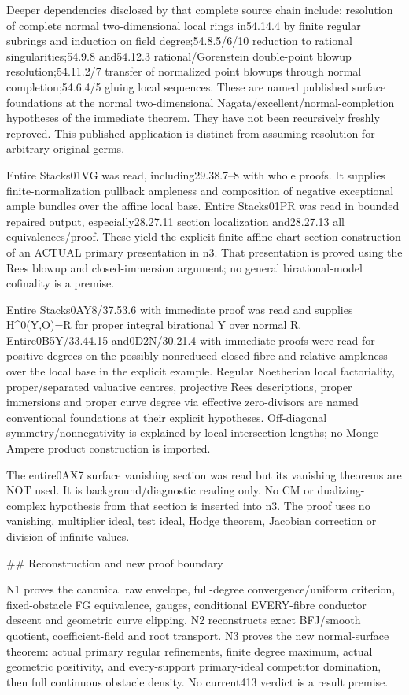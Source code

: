 \documentclass[11pt]{article}
\begin{document}
Deeper dependencies disclosed by that complete source chain include: resolution of complete normal two-dimensional local rings in54.14.4 by finite regular subrings and induction on field degree;54.8.5/6/10 reduction to rational singularities;54.9.8 and54.12.3 rational/Gorenstein double-point blowup resolution;54.11.2/7 transfer of normalized point blowups through normal completion;54.6.4/5 gluing local sequences. These are named published surface foundations at the normal two-dimensional Nagata/excellent/normal-completion hypotheses of the immediate theorem. They have not been recursively freshly reproved. This published application is distinct from assuming resolution for arbitrary original germs.

Entire Stacks01VG was read, including29.38.7--8 with whole proofs. It supplies finite-normalization pullback ampleness and composition of negative exceptional ample bundles over the affine local base. Entire Stacks01PR was read in bounded repaired output, especially28.27.11 section localization and28.27.13 all equivalences/proof. These yield the explicit finite affine-chart section construction of an ACTUAL primary presentation in n3. That presentation is proved using the Rees blowup and closed-immersion argument; no general birational-model cofinality is a premise.

Entire Stacks0AY8/37.53.6 with immediate proof was read and supplies H\textasciicircum{}0(Y,O)=R for proper integral birational Y over normal R. Entire0B5Y/33.44.15 and0D2N/30.21.4 with immediate proofs were read for positive degrees on the possibly nonreduced closed fibre and relative ampleness over the local base in the explicit example. Regular Noetherian local factoriality, proper/separated valuative centres, projective Rees descriptions, proper immersions and proper curve degree via effective zero-divisors are named conventional foundations at their explicit hypotheses. Off-diagonal symmetry/nonnegativity is explained by local intersection lengths; no Monge--Ampere product construction is imported.

The entire0AX7 surface vanishing section was read but its vanishing theorems are NOT used. It is background/diagnostic reading only. No CM or dualizing-complex hypothesis from that section is inserted into n3. The proof uses no vanishing, multiplier ideal, test ideal, Hodge theorem, Jacobian correction or division of infinite values.

\#\# Reconstruction and new proof boundary

N1 proves the canonical raw envelope, full-degree convergence/uniform criterion, fixed-obstacle FG equivalence, gauges, conditional EVERY-fibre conductor descent and geometric curve clipping. N2 reconstructs exact BFJ/smooth quotient, coefficient-field and root transport. N3 proves the new normal-surface theorem: actual primary regular refinements, finite degree maximum, actual geometric positivity, and every-support primary-ideal competitor domination, then full continuous obstacle density. No current413 verdict is a result premise.
\end{document}
